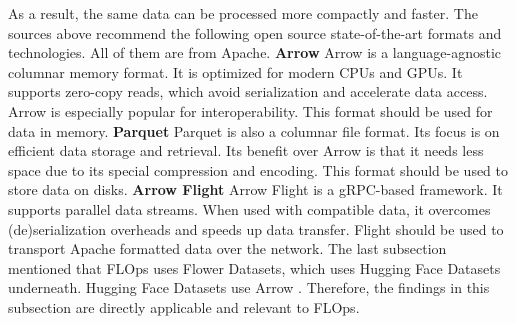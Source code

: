 As a result, the same data can be processed more compactly and faster.
\vspace{5mm}
\newline
The sources above recommend the following open source state-of-the-art formats and technologies.
All of them are from Apache.
\vspace{5mm}
\newline
\textbf{Arrow}\newline
Arrow is a language-agnostic columnar memory format.
It is optimized for modern CPUs and GPUs.
It supports zero-copy reads, which avoid serialization and accelerate data access.
Arrow is especially popular for interoperability.
This format should be used for data in memory. \cite{arrow_repo} 
\vspace{5mm}
\newline
\textbf{Parquet}\newline
Parquet is also a columnar file format.
Its focus is on efficient data storage and retrieval.
Its benefit over Arrow is that it needs less space due to its special compression and encoding.
This format should be used to store data on disks. \cite{docs:parquet}
\vspace{5mm}
\newline
\textbf{Arrow Flight}\newline
Arrow Flight is a gRPC-based framework.
It supports parallel data streams.
When used with compatible data, it overcomes (de)serialization overheads and speeds up data transfer.
Flight should be used to transport Apache formatted data over the network. \cite{docs:arrow_flight}
\vspace{5mm}
\newline
The last subsection mentioned that FLOps uses Flower Datasets, which uses Hugging Face Datasets underneath.
Hugging Face Datasets use Arrow \cite{docs:hugging_face_arrow}.
Therefore, the findings in this subsection are directly applicable and relevant to FLOps.